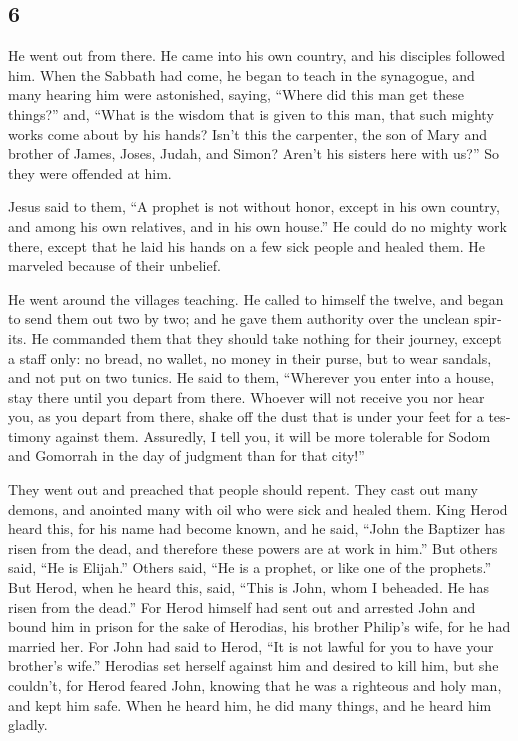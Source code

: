 \begin{paracol}{2}
\begin{otherlanguage}{english}
{\section{6}\label{section-11}}

 He went out from there. He came into his own country, and
his disciples followed him.  When the Sabbath had come, he
began to teach in the synagogue, and many hearing him were astonished,
saying, ``Where did this man get these things?'' and, ``What is the
wisdom that is given to this man, that such mighty works come about by
his hands?  Isn't this the carpenter, the son of Mary and
brother of James, Joses, Judah, and Simon? Aren't his sisters here with
us?'' So they were offended at him.

 Jesus said to them, ``A prophet is not without honor,
except in his own country, and among his own relatives, and in his own
house.''  He could do no mighty work there, except that he
laid his hands on a few sick people and healed them.  He
marveled because of their unbelief.

He went around the villages teaching.  He called to
himself the twelve, and began to send them out two by two; and he gave
them authority over the unclean spirits.  He commanded
them that they should take nothing for their journey, except a staff
only: no bread, no wallet, no money in their purse,  but
to wear sandals, and not put on two tunics.  He said to
them, ``Wherever you enter into a house, stay there until you depart
from there.  Whoever will not receive you nor hear you,
as you depart from there, shake off the dust that is under your feet for
a testimony against them. Assuredly, I tell you, it will be more
tolerable for Sodom and Gomorrah in the day of judgment than for that
city!''

 They went out and preached that people should repent.
 They cast out many demons, and anointed many with oil
who were sick and healed them.  King Herod heard this,
for his name had become known, and he said, ``John the Baptizer has
risen from the dead, and therefore these powers are at work in him.''
 But others said, ``He is Elijah.'' Others said, ``He is
a prophet, or like one of the prophets.''  But Herod,
when he heard this, said, ``This is John, whom I beheaded. He has risen
from the dead.''  For Herod himself had sent out and
arrested John and bound him in prison for the sake of Herodias, his
brother Philip's wife, for he had married her.  For John
had said to Herod, ``It is not lawful for you to have your brother's
wife.''  Herodias set herself against him and desired to
kill him, but she couldn't,  for Herod feared John,
knowing that he was a righteous and holy man, and kept him safe. When he
heard him, he did many things, and he heard him gladly.


\end{otherlanguage}
\end{paracol}

